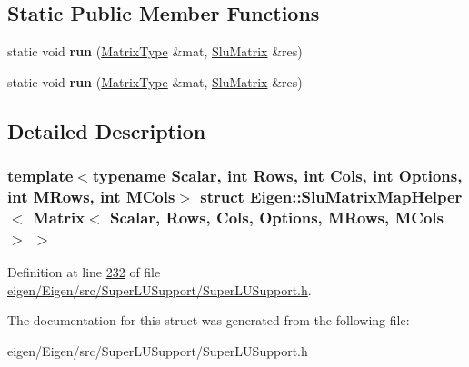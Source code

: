 \subsection*{Static Public Member Functions}
\begin{DoxyCompactItemize}
\item 
\mbox{\label{struct_eigen_1_1_slu_matrix_map_helper_3_01_matrix_3_01_scalar_00_01_rows_00_01_cols_00_01_optioce31c400c0dc6b34c9e9bbf922bc7aae_a359c47a6e575a4424c3c04bf56872290}} 
static void {\bfseries run} (\hyperlink{group___core___module_class_eigen_1_1_matrix}{Matrix\+Type} \&mat, \hyperlink{struct_eigen_1_1_slu_matrix}{Slu\+Matrix} \&res)
\item 
\mbox{\label{struct_eigen_1_1_slu_matrix_map_helper_3_01_matrix_3_01_scalar_00_01_rows_00_01_cols_00_01_optioce31c400c0dc6b34c9e9bbf922bc7aae_a359c47a6e575a4424c3c04bf56872290}} 
static void {\bfseries run} (\hyperlink{group___core___module_class_eigen_1_1_matrix}{Matrix\+Type} \&mat, \hyperlink{struct_eigen_1_1_slu_matrix}{Slu\+Matrix} \&res)
\end{DoxyCompactItemize}


\subsection{Detailed Description}
\subsubsection*{template$<$typename Scalar, int Rows, int Cols, int Options, int M\+Rows, int M\+Cols$>$\newline
struct Eigen\+::\+Slu\+Matrix\+Map\+Helper$<$ Matrix$<$ Scalar, Rows, Cols, Options, M\+Rows, M\+Cols $>$ $>$}



Definition at line \hyperlink{eigen_2_eigen_2src_2_super_l_u_support_2_super_l_u_support_8h_source_l00232}{232} of file \hyperlink{eigen_2_eigen_2src_2_super_l_u_support_2_super_l_u_support_8h_source}{eigen/\+Eigen/src/\+Super\+L\+U\+Support/\+Super\+L\+U\+Support.\+h}.



The documentation for this struct was generated from the following file\+:\begin{DoxyCompactItemize}
\item 
eigen/\+Eigen/src/\+Super\+L\+U\+Support/\+Super\+L\+U\+Support.\+h\end{DoxyCompactItemize}
